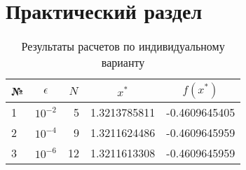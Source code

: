 \chapter{Практический раздел}


\begin{table}[h!]
    \caption{Результаты расчетов по индивидуальному варианту}
    \label{tab:results}
    \begin{tabular}{|l|l|r|r|r|}
    \hline
    \multicolumn{1}{|c|}{№} & \multicolumn{1}{c|}{\textbf{$\epsilon$}} & \multicolumn{1}{c|}{$N$} & \multicolumn{1}{c|}{\textbf{$x^{*}$}} & \multicolumn{1}{c|}{\textbf{$f(x^{*})$}} \\ \hline
    1                                & $10^{-2}$                                             & 5                              & 1.3213785811                              & -0.4609645405                               \\ \hline
    2                                & $10^{-4}$                                             & 9                              & 1.3211624486                              & -0.4609645959                                \\ \hline
    3                                & $10^{-6}$                                             & 12                              & 1.3211613308                              & -0.4609645959                                \\ \hline
    \end{tabular}
    \end{table}